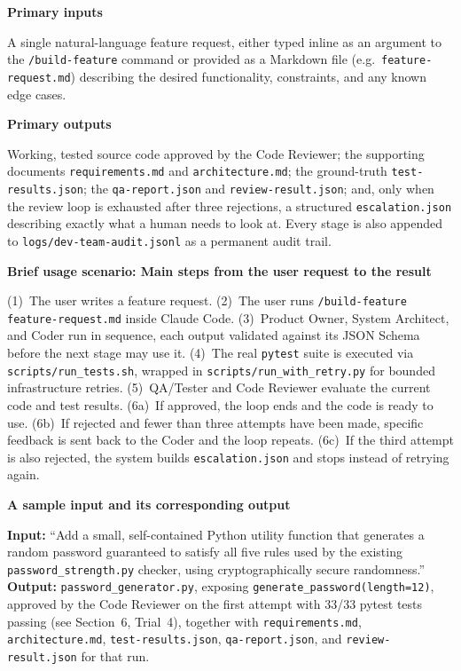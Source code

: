 \documentclass[11pt,a4paper]{article}
\newcommand{\answerarea}[2]{\textbf{#1}\par\begin{answerbox}#2\end{answerbox}}
\begin{document}
\answerarea{Primary inputs}{
A single natural-language feature request, either typed inline as an argument to the
\texttt{/build-feature} command or provided as a Markdown file (e.g.\ \texttt{feature-request.md})
describing the desired functionality, constraints, and any known edge cases.
}

\answerarea{Primary outputs}{
Working, tested source code approved by the Code Reviewer; the supporting documents
\texttt{requirements.md} and \texttt{architecture.md}; the ground-truth
\texttt{test-results.json}; the \texttt{qa-report.json} and \texttt{review-result.json};
and, only when the review loop is exhausted after three rejections, a structured
\texttt{escalation.json} describing exactly what a human needs to look at. Every stage is
also appended to \texttt{logs/dev-team-audit.jsonl} as a permanent audit trail.
}

\answerarea{Brief usage scenario: Main steps from the user request to the result}{
(1)~The user writes a feature request. (2)~The user runs
\texttt{/build-feature feature-request.md} inside Claude Code. (3)~Product Owner,
System Architect, and Coder run in sequence, each output validated against its JSON
Schema before the next stage may use it. (4)~The real \texttt{pytest} suite is executed
via \texttt{scripts/run\_tests.sh}, wrapped in \texttt{scripts/run\_with\_retry.py} for
bounded infrastructure retries. (5)~QA/Tester and Code Reviewer evaluate the current code
and test results. (6a)~If approved, the loop ends and the code is ready to use. (6b)~If
rejected and fewer than three attempts have been made, specific feedback is sent back to
the Coder and the loop repeats. (6c)~If the third attempt is also rejected, the system
builds \texttt{escalation.json} and stops instead of retrying again.
}

\answerarea{A sample input and its corresponding output}{
\textbf{Input:} ``Add a small, self-contained Python utility function that generates a
random password guaranteed to satisfy all five rules used by the existing
\texttt{password\_strength.py} checker, using cryptographically secure randomness.''\\[3pt]
\textbf{Output:} \texttt{password\_generator.py}, exposing
\texttt{generate\_password(length=12)}, approved by the Code Reviewer on the first
attempt with 33/33 pytest tests passing (see Section~6, Trial~4), together with
\texttt{requirements.md}, \texttt{architecture.md}, \texttt{test-results.json},
\texttt{qa-report.json}, and \texttt{review-result.json} for that run.
}
\end{document}
